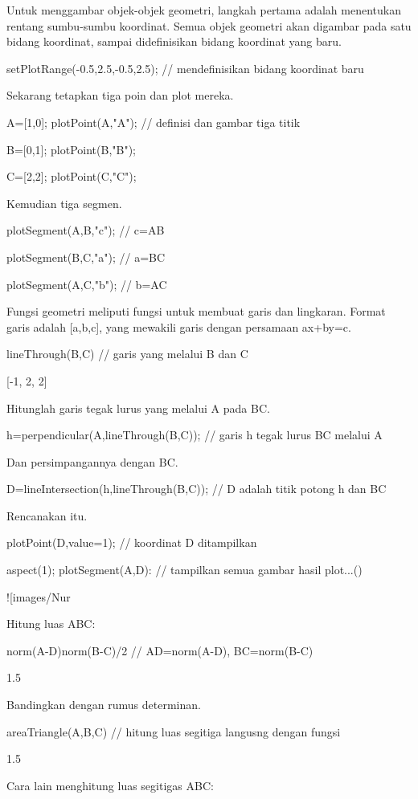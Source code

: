 \documentclass{article}
\begin{document}
Untuk menggambar objek-objek geometri, langkah pertama adalah menentukan rentang sumbu-sumbu
koordinat. Semua objek geometri akan digambar pada satu bidang koordinat, sampai
didefinisikan bidang koordinat yang baru.


\>setPlotRange(-0.5,2.5,-0.5,2.5); // mendefinisikan bidang koordinat baru 


Sekarang tetapkan tiga poin dan plot mereka.


\>A=[1,0]; plotPoint(A,"A"); // definisi dan gambar tiga titik

\>B=[0,1]; plotPoint(B,"B");

\>C=[2,2]; plotPoint(C,"C");


Kemudian tiga segmen.


\>plotSegment(A,B,"c"); // c=AB

\>plotSegment(B,C,"a"); // a=BC

\>plotSegment(A,C,"b"); // b=AC


Fungsi geometri meliputi fungsi untuk membuat garis dan lingkaran.
Format garis adalah [a,b,c], yang mewakili garis dengan persamaan
ax+by=c.


\>lineThrough(B,C) // garis yang melalui B dan C


    [-1,  2,  2]

Hitunglah garis tegak lurus yang melalui A pada BC.


\>h=perpendicular(A,lineThrough(B,C)); // garis h tegak lurus BC melalui A


Dan persimpangannya dengan BC.


\>D=lineIntersection(h,lineThrough(B,C)); // D adalah titik potong h dan BC


Rencanakan itu.


\>plotPoint(D,value=1); // koordinat D ditampilkan

\>aspect(1); plotSegment(A,D): // tampilkan semua gambar hasil plot...()


![images/Nur%

Hitung luas ABC:


\>norm(A-D)\*norm(B-C)/2 // AD=norm(A-D), BC=norm(B-C)


    1.5

Bandingkan dengan rumus determinan.


\>areaTriangle(A,B,C) // hitung luas segitiga langusng dengan fungsi


    1.5

Cara lain menghitung luas segitigas ABC:
\end{document}
